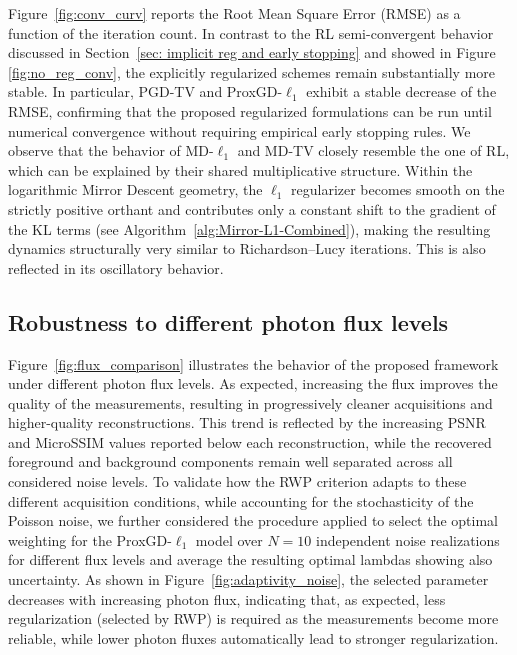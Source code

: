 \documentclass[letterpaper]{article}
\begin{document}
Figure~\ref{fig:conv_curv} reports the Root Mean Square Error (RMSE)  as a function of the iteration count. In contrast to the RL semi-convergent behavior discussed in Section~\ref{sec: implicit reg and early stopping} and showed in Figure \ref{fig:no_reg_conv}, the explicitly regularized schemes remain substantially more stable. In particular, PGD-TV and ProxGD-$\ell_1$ exhibit a stable decrease of the RMSE, confirming that the proposed regularized formulations can be run until numerical convergence without requiring empirical early stopping rules. We observe that the behavior of MD-$\ell_1$ and MD-TV closely resemble the one of RL, which can be explained by their shared multiplicative structure. Within the logarithmic Mirror Descent geometry, the $\ell_1$ regularizer becomes smooth on the strictly positive orthant and contributes only a constant shift to the gradient of the KL terms (see Algorithm~\ref{alg:Mirror-L1-Combined}), making the resulting dynamics structurally very similar to Richardson--Lucy iterations. This is also reflected in its oscillatory behavior. %

\subsection{Robustness to different photon flux levels}


Figure~\ref{fig:flux_comparison} illustrates the behavior of the proposed framework under different photon flux levels. As expected, increasing the flux improves the quality of the measurements, resulting in progressively cleaner acquisitions and higher-quality reconstructions. This trend is reflected by the increasing PSNR and MicroSSIM values reported below each reconstruction, while the recovered foreground and background components remain well separated across all considered noise levels. To validate how the RWP criterion adapts to these different acquisition conditions, while accounting for the stochasticity of the Poisson noise, we further considered the procedure applied to select the optimal weighting for the ProxGD-$\ell_1$ model over $N = 10$ independent noise realizations for different flux levels and average the resulting optimal lambdas  showing also uncertainty. As shown in Figure~\ref{fig:adaptivity_noise}, the selected parameter decreases with increasing photon flux, indicating that, as expected, less regularization (selected by RWP) is required as the measurements become more reliable, while lower photon fluxes automatically lead to stronger regularization. 
\end{document}
